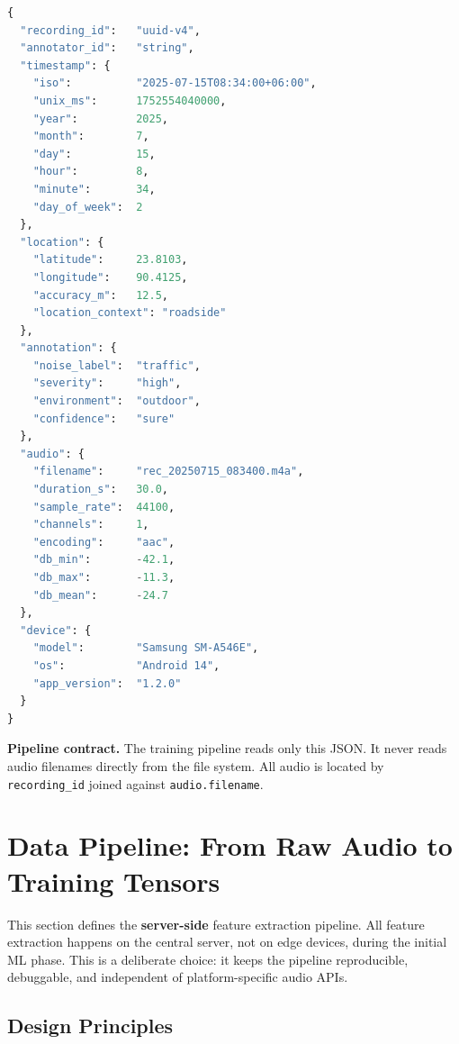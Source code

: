 \documentclass[11pt,a4paper]{article}
\begin{document}
\begin{lstlisting}[language=Python, caption={JSON Metadata Schema}]
{
  "recording_id":   "uuid-v4",
  "annotator_id":   "string",
  "timestamp": {
    "iso":          "2025-07-15T08:34:00+06:00",
    "unix_ms":      1752554040000,
    "year":         2025,
    "month":        7,
    "day":          15,
    "hour":         8,
    "minute":       34,
    "day_of_week":  2
  },
  "location": {
    "latitude":     23.8103,
    "longitude":    90.4125,
    "accuracy_m":   12.5,
    "location_context": "roadside"
  },
  "annotation": {
    "noise_label":  "traffic",
    "severity":     "high",
    "environment":  "outdoor",
    "confidence":   "sure"
  },
  "audio": {
    "filename":     "rec_20250715_083400.m4a",
    "duration_s":   30.0,
    "sample_rate":  44100,
    "channels":     1,
    "encoding":     "aac",
    "db_min":       -42.1,
    "db_max":       -11.3,
    "db_mean":      -24.7
  },
  "device": {
    "model":        "Samsung SM-A546E",
    "os":           "Android 14",
    "app_version":  "1.2.0"
  }
}
\end{lstlisting}

\textbf{Pipeline contract.} The training pipeline reads only this JSON. It never
reads audio filenames directly from the file system. All audio is located by
\texttt{recording\_id} joined against \texttt{audio.filename}.

\section{Data Pipeline: From Raw Audio to Training Tensors}

This section defines the \textbf{server-side} feature extraction pipeline. All
feature extraction happens on the central server, not on edge devices, during the
initial ML phase. This is a deliberate choice: it keeps the pipeline reproducible,
debuggable, and independent of platform-specific audio APIs.

\subsection{Design Principles}
\end{document}
